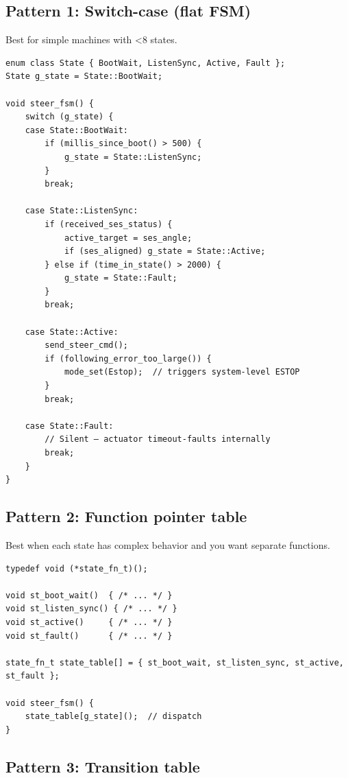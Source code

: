 \documentclass[12pt,a4paper,oneside]{report}
\begin{document}
\subsection{Pattern 1: Switch-case (flat
FSM)}\label{pattern-1-switch-case-flat-fsm}

Best for simple machines with \textless8 states.

\begin{verbatim}
enum class State { BootWait, ListenSync, Active, Fault };
State g_state = State::BootWait;

void steer_fsm() {
    switch (g_state) {
    case State::BootWait:
        if (millis_since_boot() > 500) {
            g_state = State::ListenSync;
        }
        break;

    case State::ListenSync:
        if (received_ses_status) {
            active_target = ses_angle;
            if (ses_aligned) g_state = State::Active;
        } else if (time_in_state() > 2000) {
            g_state = State::Fault;
        }
        break;

    case State::Active:
        send_steer_cmd();
        if (following_error_too_large()) {
            mode_set(Estop);  // triggers system-level ESTOP
        }
        break;

    case State::Fault:
        // Silent — actuator timeout-faults internally
        break;
    }
}
\end{verbatim}

\subsection{Pattern 2: Function pointer
table}\label{pattern-2-function-pointer-table}

Best when each state has complex behavior and you want separate functions.

\begin{verbatim}
typedef void (*state_fn_t)();

void st_boot_wait()  { /* ... */ }
void st_listen_sync() { /* ... */ }
void st_active()     { /* ... */ }
void st_fault()      { /* ... */ }

state_fn_t state_table[] = { st_boot_wait, st_listen_sync, st_active, st_fault };

void steer_fsm() {
    state_table[g_state]();  // dispatch
}
\end{verbatim}

\subsection{Pattern 3: Transition table}\label{pattern-3-transition-table}
\end{document}
